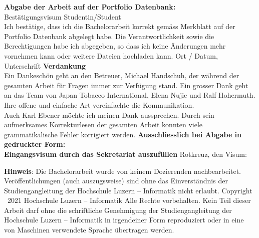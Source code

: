 	
	\newpage
	\noindent
	\textbf{Abgabe der Arbeit auf der Portfolio Datenbank:}\\
	Best\"atigungsvisum Studentin/Student\\
	Ich best\"atige, dass ich die Bachelorarbeit korrekt gem\"ass Merkblatt auf der Portfolio Datenbank abgelegt habe. Die Verantwortlichkeit sowie die Berechtigungen habe ich abgegeben, so dass ich keine \"Anderungen mehr vornehmen kann oder weitere Dateien hochladen kann. \newline \newline 
	Ort / Datum, Unterschrift	\underline{\hspace*{4cm}} \newline \newline
	\textbf{Verdankung}\\
	{	Ein Dankeschön geht an den Betreuer, Michael Handschuh, der während der gesamten Arbeit für Fragen immer zur Verfügung stand. Ein grosser Dank geht an das Team von Japan Tobacco International, Elena Nujic und Ralf Hohermuth. Ihre offene und einfache Art vereinfachte die Kommunikation. \\
	Auch Karl Ebener möchte ich meinen Dank aussprechen. Durch sein aufmerksames Korrekturlesen der gesamten Arbeit konnten viele grammatikalische Fehler korrigiert werden. } \newline \newline \newline
	\noindent
	{\textbf{Ausschliesslich bei Abgabe in gedruckter Form: \\
			Eingangsvisum durch das Sekretariat auszuf\"ullen}} \newline \newline
	Rotkreuz, den	\underline{\hspace*{4cm}} \hspace*{1cm}	Visum:	\underline{\hspace*{4cm}} \vspace*{10cm}
	
	

	\noindent
	{\textbf{Hinweis}}: Die Bachelorarbeit wurde von keinem Dozierenden nachbearbeitet. Ver\"offentlichungen (auch auszugsweise) sind ohne das Einverst\"andnis der Studiengangleitung der Hochschule Luzern -- Informatik nicht erlaubt. \newline \newline
	Copyright \textcopyright\ {2021} Hochschule Luzern -- Informatik \newline \newline
	Alle Rechte vorbehalten. Kein Teil dieser Arbeit darf ohne die schriftliche Genehmigung der Studiengangleitung der Hochschule Luzern -- Informatik in irgendeiner Form reproduziert oder in eine von Maschinen verwendete Sprache übertragen werden.
	
	\newpage
	

